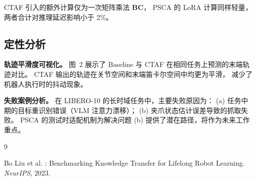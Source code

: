 \documentclass[10pt,twocolumn]{article}
\begin{document}
CTAF 引入的额外计算仅为一次矩阵乘法 $\mathbf{B}\mathbf{C}$，
PSCA 的 LoRA 计算同样轻量，两者合计对推理延迟影响小于 2\%。

\subsection{定性分析}

\noindent\textbf{轨迹平滑度可视化。}
图~2 展示了 Baseline 与 CTAF 在相同任务上预测的末端轨迹对比。
CTAF 输出的轨迹在关节空间和末端笛卡尔空间中均更为平滑，
减少了机器人执行时的抖动现象。

\noindent\textbf{失败案例分析。}
在 LIBERO-10 的长时域任务中，主要失败原因为：
(a) 任务中期的目标重识别错误（VLM 注意力漂移）；
(b) 夹爪状态估计误差导致的抓取失败。
PSCA 的测试时适配机制为解决问题 (b) 提供了潜在路径，将作为未来工作重点。


\begin{thebibliography}{9}

Bo Liu et al.
: Benchmarking Knowledge Transfer for Lifelong Robot Learning.
\newblock \emph{NeurIPS}, 2023.

\end{thebibliography}
\end{document}
